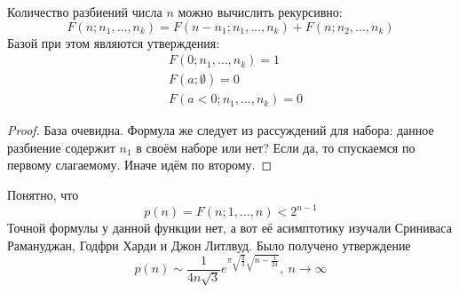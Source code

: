 \begin{theorem}
	Количество разбиений числа $n$ можно вычислить рекурсивно:
	\[
		F(n; n_1, \ldots, n_k) = F(n - n_1; n_1, \ldots, n_k) + F(n; n_2, \ldots, n_k)
	\]
	Базой при этом являются утверждения:
	\begin{align*}
		&F(0; n_1, \ldots, n_k) = 1
		\\
		&F(a; \emptyset) = 0
		\\
		&F(a < 0; n_1, \ldots, n_k) = 0
	\end{align*}
\end{theorem}

\begin{proof}
	База очевидна. Формула же следует из рассуждений для набора: данное разбиение содержит $n_1$ в своём наборе или нет? Если да, то спускаемся по первому слагаемому. Иначе идём по второму.
\end{proof}

\begin{note}
	Понятно, что
	\[
		p(n) = F(n; 1, \ldots, n) < 2^{n - 1}
	\]
	Точной формулы у данной функции нет, а вот её асимптотику изучали Сриниваса Рамануджан, Годфри Харди и Джон Литлвуд. Было получено утверждение
	\[
		p(n) \sim \frac{1}{4n\sqrt{3}} e^{\pi\sqrt{\frac{2}{3}}\sqrt{n - \frac{1}{24}}},\ n \to \infty
	\]
\end{note}